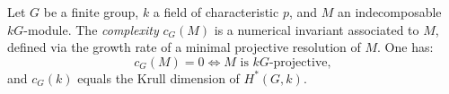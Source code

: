 Let $G$ be a finite group, $k$ a field of characteristic $p$, and $M$ an indecomposable $kG$-module. The {\it complexity} $c_G(M)$ is a numerical invariant associated to $M$, defined via the growth rate of a minimal projective resolution of $M$. One has:
\[
c_G(M) = 0 \iff M \text{ is $kG$-projective},
\]
and $c_G(k)$ equals the Krull dimension of $H^*(G, k)$.
